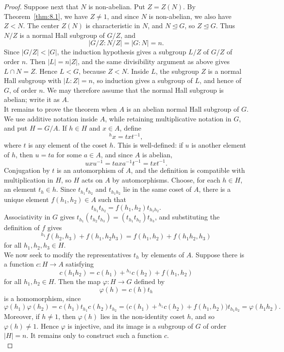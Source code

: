 \documentclass[../Odyssey_Project.tex]{subfiles}
\begin{document}
\begin{proof}
Suppose next that $N$ is non-abelian. Put $Z=Z(N)$. By Theorem~\ref{thm:8.1}, we have $Z\neq 1$, and since $N$ is non-abelian, we also have $Z<N$. The center $Z(N)$ is characteristic in $N$, and $N\trianglelefteq G$, so $Z\trianglelefteq G$. Thus $N/Z$ is a normal Hall subgroup of $G/Z$, and
\[
    \lvert G/Z:N/Z\rvert=\lvert G:N\rvert=n.
\]
Since $\lvert G/Z\rvert<\lvert G\rvert$, the induction hypothesis gives a subgroup $L/Z$ of $G/Z$ of order $n$. Then $\lvert L\rvert=n\lvert Z\rvert$, and the same divisibility argument as above gives $L\cap N=Z$. Hence $L<G$, because $Z<N$. Inside $L$, the subgroup $Z$ is a normal Hall subgroup with $\lvert L:Z\rvert=n$, so induction gives a subgroup of $L$, and hence of $G$, of order $n$. We may therefore assume that the normal Hall subgroup is abelian; write it as $A$.\\
It remains to prove the theorem when $A$ is an abelian normal Hall subgroup of $G$. We use additive notation inside $A$, while retaining multiplicative notation in $G$, and put $H=G/A$. If $h\in H$ and $x\in A$, define
\[
    {}^h x=t x t^{-1},
\]
where $t$ is any element of the coset $h$. This is well-defined: if $u$ is another element of $h$, then $u=ta$ for some $a\in A$, and since $A$ is abelian,
\[
    uxu^{-1}=t a x a^{-1}t^{-1}=t x t^{-1}.
\]
Conjugation by $t$ is an automorphism of $A$, and the definition is compatible with multiplication in $H$, so $H$ acts on $A$ by automorphisms. Choose, for each $h\in H$, an element $t_h\in h$. Since $t_{h_1}t_{h_2}$ and $t_{h_1h_2}$ lie in the same coset of $A$, there is a unique element $f(h_1,h_2)\in A$ such that
\[
    t_{h_1}t_{h_2}=f(h_1,h_2)t_{h_1h_2}.
\]
Associativity in $G$ gives $t_{h_1}(t_{h_2}t_{h_3})=(t_{h_1}t_{h_2})t_{h_3}$, and substituting the definition of $f$ gives
\[
    {}^{h_1}f(h_2,h_3)+f(h_1,h_2h_3)
    =f(h_1,h_2)+f(h_1h_2,h_3)
\]
for all $h_1,h_2,h_3\in H$.\\
We now seek to modify the representatives $t_h$ by elements of $A$. Suppose there is a function $c\colon H\to A$ satisfying
\[
    c(h_1h_2)
    =c(h_1)+{}^{h_1}c(h_2)+f(h_1,h_2)
\]
for all $h_1,h_2\in H$. Then the map $\varphi\colon H\to G$ defined by
\[
    \varphi(h)=c(h)t_h
\]
is a homomorphism, since
\[
    \varphi(h_1)\varphi(h_2)
    =c(h_1)t_{h_1}c(h_2)t_{h_2}
    =\bigl(c(h_1)+{}^{h_1}c(h_2)+f(h_1,h_2)\bigr)t_{h_1h_2}
    =\varphi(h_1h_2).
\]
Moreover, if $h\neq 1$, then $\varphi(h)$ lies in the non-identity coset $h$, and so $\varphi(h)\neq 1$. Hence $\varphi$ is injective, and its image is a subgroup of $G$ of order $\lvert H\rvert=n$. It remains only to construct such a function $c$.\\

\end{proof}
\end{document}
